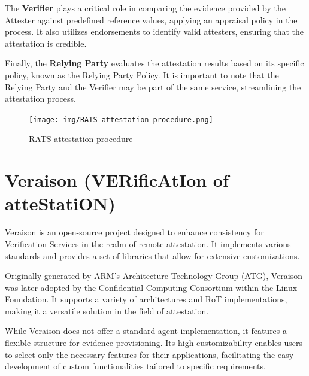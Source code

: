 The \textbf{Verifier} plays a critical role in comparing the evidence
provided by the Attester against predefined reference values, applying
an appraisal policy in the process. It also utilizes endorsements to
identify valid attesters, ensuring that the attestation is credible.

Finally, the \textbf{Relying Party} evaluates the attestation results
based on its specific policy, known as the Relying Party Policy. It is
important to note that the Relying Party and the Verifier may be part
of the same service, streamlining the attestation process.


\begin{figure}[H]
  \centering
  \texttt{[image: img/RATS attestation
  procedure.png]}
  \caption{RATS attestation procedure}
\end{figure}

\section{Veraison (VERificAtIon of atteStatiON)}

Veraison is an open-source project designed to enhance consistency for
Verification Services in the realm of remote attestation. It
implements various standards and provides a set of libraries that
allow for extensive customizations.

Originally generated by ARM's Architecture Technology Group (ATG),
Veraison was later adopted by the Confidential Computing Consortium
within the Linux Foundation. It supports a variety of architectures
and RoT implementations, making it a versatile
solution in the field of attestation.

While Veraison does not offer a standard agent implementation, it
features a flexible structure for evidence provisioning. Its high
customizability enables users to select only the necessary features
for their applications, facilitating the easy development of custom
functionalities tailored to specific requirements.

